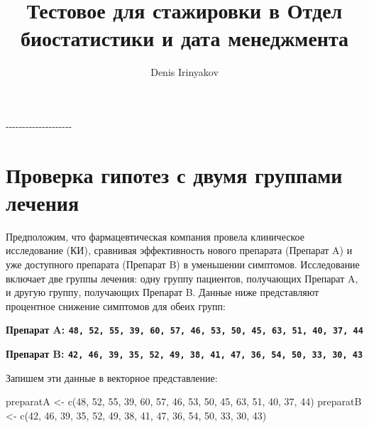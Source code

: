 \documentclass[
]{article}
\title{Тестовое для стажировки в Отдел биостатистики и дата менеджмента}
\author{Denis Irinyakov}
\date{}
\newenvironment{Shaded}{\begin{snugshade}}{\end{snugshade}}
\newcommand{\DecValTok}[1]{\textcolor[rgb]{0.00,0.00,0.81}{#1}}
\newcommand{\FunctionTok}[1]{\textcolor[rgb]{0.00,0.00,0.00}{#1}}
\newcommand{\NormalTok}[1]{#1}
\newcommand{\OtherTok}[1]{\textcolor[rgb]{0.56,0.35,0.01}{#1}}
\begin{document}
\maketitle

-\/-\/-\/-\/-\/-\/-\/-\/-\/-\/-\/-\/-\/-\/-\/-\/-\/-\/-\/-

\hypertarget{ux43fux440ux43eux432ux435ux440ux43aux430-ux433ux438ux43fux43eux442ux435ux437-ux441-ux434ux432ux443ux43cux44f-ux433ux440ux443ux43fux43fux430ux43cux438-ux43bux435ux447ux435ux43dux438ux44f}{%
\section{Проверка гипотез с двумя группами
лечения}\label{ux43fux440ux43eux432ux435ux440ux43aux430-ux433ux438ux43fux43eux442ux435ux437-ux441-ux434ux432ux443ux43cux44f-ux433ux440ux443ux43fux43fux430ux43cux438-ux43bux435ux447ux435ux43dux438ux44f}}

Предположим, что фармацевтическая компания провела клиническое
исследование (КИ), сравнивая эффективность нового препарата (Препарат A)
и уже доступного препарата (Препарат B) в уменьшении симптомов.
Исследование включает две группы лечения: одну группу пациентов,
получающих Препарат A, и другую группу, получающих Препарат B. Данные
ниже представляют процентное снижение симптомов для обеих групп:

\textbf{Препарат A:
\texttt{48,\ 52,\ 55,\ 39,\ 60,\ 57,\ 46,\ 53,\ 50,\ 45,\ 63,\ 51,\ 40,\ 37,\ 44}}

\textbf{Препарат B:
\texttt{42,\ 46,\ 39,\ 35,\ 52,\ 49,\ 38,\ 41,\ 47,\ 36,\ 54,\ 50,\ 33,\ 30,\ 43}}

Запишем эти данные в векторное представление:

\begin{Shaded}
\begin{Highlighting}[]
\NormalTok{preparatA }\OtherTok{\textless{}{-}} \FunctionTok{c}\NormalTok{(}\DecValTok{48}\NormalTok{, }\DecValTok{52}\NormalTok{, }\DecValTok{55}\NormalTok{, }\DecValTok{39}\NormalTok{, }\DecValTok{60}\NormalTok{, }\DecValTok{57}\NormalTok{, }\DecValTok{46}\NormalTok{, }\DecValTok{53}\NormalTok{, }\DecValTok{50}\NormalTok{, }\DecValTok{45}\NormalTok{, }\DecValTok{63}\NormalTok{, }\DecValTok{51}\NormalTok{, }\DecValTok{40}\NormalTok{, }\DecValTok{37}\NormalTok{, }\DecValTok{44}\NormalTok{)}
\NormalTok{preparatB }\OtherTok{\textless{}{-}} \FunctionTok{c}\NormalTok{(}\DecValTok{42}\NormalTok{, }\DecValTok{46}\NormalTok{, }\DecValTok{39}\NormalTok{, }\DecValTok{35}\NormalTok{, }\DecValTok{52}\NormalTok{, }\DecValTok{49}\NormalTok{, }\DecValTok{38}\NormalTok{, }\DecValTok{41}\NormalTok{, }\DecValTok{47}\NormalTok{, }\DecValTok{36}\NormalTok{, }\DecValTok{54}\NormalTok{, }\DecValTok{50}\NormalTok{, }\DecValTok{33}\NormalTok{, }\DecValTok{30}\NormalTok{, }\DecValTok{43}\NormalTok{)}
\end{Highlighting}
\end{Shaded}
\end{document}
